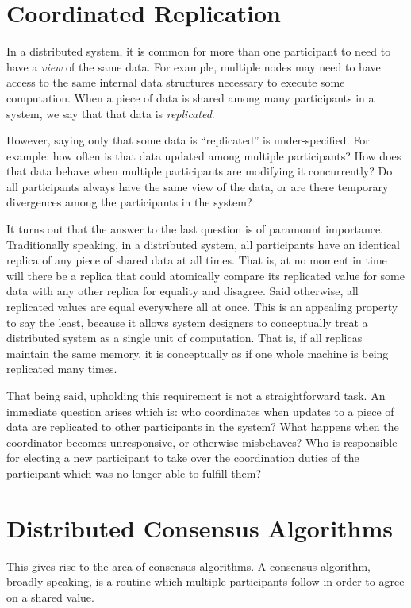 \section{Coordinated Replication}
In a distributed system, it is common for more than one participant to need to
have a \textit{view} of the same data. For example, multiple nodes may need to
have access to the same internal data structures necessary to execute some
computation. When a piece of data is shared among many participants in a system,
we say that that data is \textit{replicated}.

However, saying only that some data is ``replicated'' is under-specified. For
example: how often is that data updated among multiple participants? How does
that data behave when multiple participants are modifying it concurrently? Do
all participants always have the same view of the data, or are there temporary
divergences among the participants in the system?

It turns out that the answer to the last question is of paramount importance.
Traditionally speaking, in a distributed system, all participants have an
identical replica of any piece of shared data at all times. That is, at no
moment in time will there be a replica that could atomically compare its
replicated value for some data with any other replica for equality and disagree.
Said otherwise, all replicated values are equal everywhere all at once. This is
an appealing property to say the least, because it allows system designers to
conceptually treat a distributed system as a single unit of computation. That
is, if all replicas maintain the same memory, it is conceptually as if one whole
machine is being replicated many times.

That being said, upholding this requirement is not a straightforward task. An
immediate question arises which is: who coordinates when updates to a piece of
data are replicated to other participants in the system? What happens when the
coordinator becomes unresponsive, or otherwise misbehaves? Who is responsible
for electing a new participant to take over the coordination duties of the
participant which was no longer able to fulfill them?

\section{Distributed Consensus Algorithms}

This gives rise to the area of consensus algorithms. A consensus algorithm,
broadly speaking, is a routine which multiple participants follow in order to
agree on a shared value.

